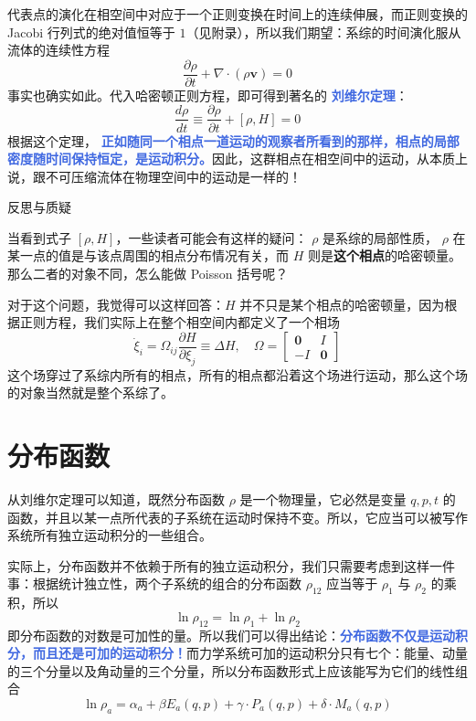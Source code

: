 代表点的演化在相空间中对应于一个正则变换在时间上的连续伸展\cite{liang}，而正则变换的Jacobi 行列式的绝对值恒等于 $1$（见附录），所以我们期望：系综的时间演化服从流体的连续性方程
\begin{equation}
    \frac{\partial \rho}{\partial t} + \nabla \cdot (\rho \bm{v}) = 0
\end{equation}
事实也确实如此。代入哈密顿正则方程，即可得到著名的 \textcolor{RoyalBlue}{\textbf{\kaishu 刘维尔定理}}：
\begin{equation}
    \frac{d \rho}{dt} \equiv \frac{\partial \rho}{\partial t} + [\rho ,H] = 0
\end{equation}
根据这个定理， \textcolor{RoyalBlue}{\textbf{\kaishu 正如随同一个相点一道运动的观察者所看到的那样，相点的局部密度随时间保持恒定，是运动积分。}}因此，这群相点在相空间中的运动，从本质上说，跟不可压缩流体在物理空间中的运动是一样的！

\begin{justification}{\kaishu 反思与质疑}
    \kaishu \fontsize{11pt}{16pt}
    
    \quad\quad 当看到式子 $[\rho , H]$，一些读者可能会有这样的疑问： $\rho$ 是系综的局部性质， $\rho$ 在某一点的值是与该点周围的相点分布情况有关，而 $H$ 则是\textbf{这个相点}的哈密顿量。那么二者的对象不同，怎么能做 Poisson 括号呢？
    
    \quad\quad 对于这个问题，我觉得可以这样回答：$H$ 并不只是某个相点的哈密顿量，因为根据正则方程，我们实际上在整个相空间内都定义了一个相场\cite{pan}
    \[
        \dot\xi_i = \Omega_{ij}\frac{\partial H}{\partial \xi_j} \equiv \Delta H,\quad \Omega =
        \begin{bmatrix}
            \bm{0} & I\\
            -I& \bm{0}
        \end{bmatrix}
    \]
    这个场穿过了系综内所有的相点，所有的相点都沿着这个场进行运动，那么这个场的对象当然就是整个系综了。
    \end{justification}

\section{分布函数}\label{sec:分布函数}

从刘维尔定理可以知道，既然分布函数 $\rho$ 是一个物理量，它必然是变量 $q,p,t$ 的函数，并且以某一点所代表的子系统在运动时保持不变。所以，它应当可以被写作系统所有独立运动积分的一些组合。

实际上，分布函数并不依赖于所有的独立运动积分，我们只需要考虑到这样一件事：根据统计独立性，两个子系统的组合的分布函数 $\rho_{12}$ 应当等于 $\rho_1$ 与 $\rho_2$ 的乘积，所以
\begin{equation}\label{equ:jiahe}
    \ln\rho_{12} = \ln \rho_1 + \ln \rho_2
\end{equation}
即分布函数的对数是可加性的量。所以我们可以得出结论：\textcolor{RoyalBlue}{\textbf{\kaishu 分布函数不仅是运动积分，而且还是可加的运动积分！}}而力学系统可加的运动积分只有七个：能量、动量的三个分量以及角动量的三个分量，所以分布函数形式上应该能写为它们的线性组合
\begin{equation}\label{equ:linearcombination}
    \ln \rho_a = \alpha_a + \beta E_a(q,p) + \gamma \cdot P_a(q,p) + \delta \cdot M_a (q,p)
\end{equation}

